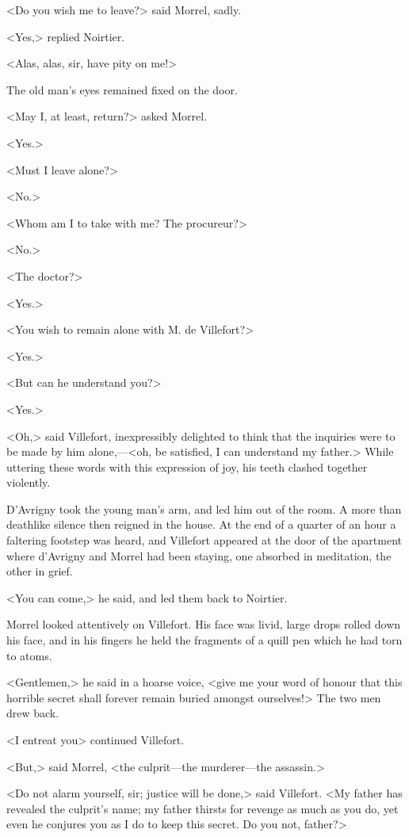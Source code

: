  <Do you wish me to leave?> said Morrel, sadly. 

 <Yes,> replied Noirtier. 

 <Alas, alas, sir, have pity on me!> 

 The old man's eyes remained fixed on the door. 

 <May I, at least, return?> asked Morrel. 

 <Yes.> 

 <Must I leave alone?> 

 <No.> 

 <Whom am I to take with me? The procureur?> 

 <No.> 

 <The doctor?> 

 <Yes.> 

 <You wish to remain alone with M. de Villefort?> 

 <Yes.> 

 <But can he understand you?> 

 <Yes.> 

 <Oh,> said Villefort, inexpressibly delighted to think that the inquiries were to be made by him alone,—<oh, be satisfied, I can understand my father.> While uttering these words with this expression of joy, his teeth clashed together violently. 

 D'Avrigny took the young man's arm, and led him out of the room. A more than deathlike silence then reigned in the house. At the end of a quarter of an hour a faltering footstep was heard, and Villefort appeared at the door of the apartment where d'Avrigny and Morrel had been staying, one absorbed in meditation, the other in grief. 

 <You can come,> he said, and led them back to Noirtier. 

 Morrel looked attentively on Villefort. His face was livid, large drops rolled down his face, and in his fingers he held the fragments of a quill pen which he had torn to atoms. 

 <Gentlemen,> he said in a hoarse voice, <give me your word of honour that this horrible secret shall forever remain buried amongst ourselves!> The two men drew back. 

 <I entreat you\longdash> continued Villefort. 

 <But,> said Morrel, <the culprit—the murderer—the assassin.> 

 <Do not alarm yourself, sir; justice will be done,> said Villefort. <My father has revealed the culprit's name; my father thirsts for revenge as much as you do, yet even he conjures you as I do to keep this secret. Do you not, father?> 

